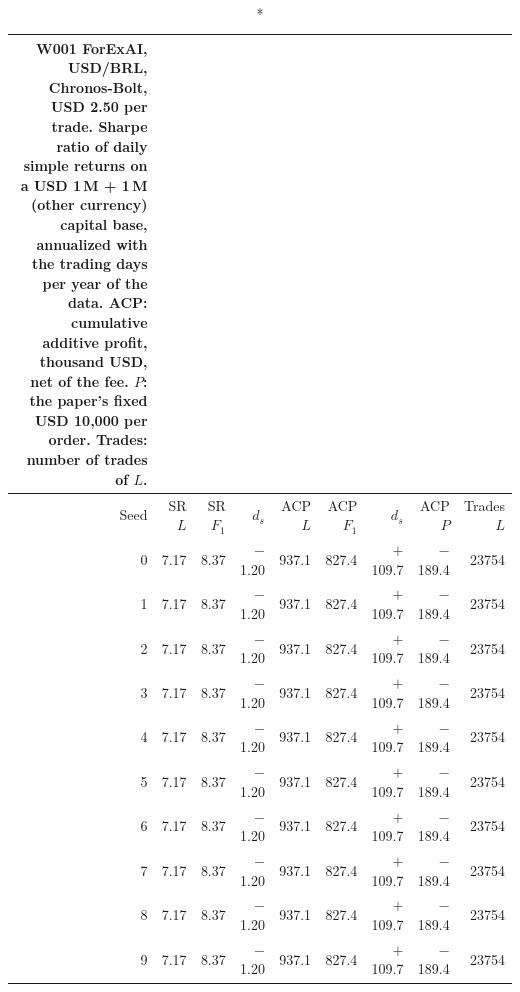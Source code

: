 \begin{longtable}{@{}rrrrrrrrr@{}}
\caption*{\small W001 ForExAI, USD/BRL, Chronos-Bolt, USD 2.50 per trade. Sharpe ratio of daily simple returns on a USD 1\,M + 1\,M (other currency) capital base, annualized with the trading days per year of the data. ACP: cumulative additive profit, thousand USD, net of the fee. $P$: the paper's fixed USD 10,000 per order. Trades: number of trades of $L$.}\\
\toprule
Seed & SR $L$ & SR $F_1$ & $d_s$ & ACP $L$ & ACP $F_1$ & $d_s$ & ACP $P$ & Trades $L$\\ \midrule\endhead
0 & 7.17 & 8.37 & $-$1.20 & 937.1 & 827.4 & $+$109.7 & $-$189.4 & 23754\\
1 & 7.17 & 8.37 & $-$1.20 & 937.1 & 827.4 & $+$109.7 & $-$189.4 & 23754\\
2 & 7.17 & 8.37 & $-$1.20 & 937.1 & 827.4 & $+$109.7 & $-$189.4 & 23754\\
3 & 7.17 & 8.37 & $-$1.20 & 937.1 & 827.4 & $+$109.7 & $-$189.4 & 23754\\
4 & 7.17 & 8.37 & $-$1.20 & 937.1 & 827.4 & $+$109.7 & $-$189.4 & 23754\\
5 & 7.17 & 8.37 & $-$1.20 & 937.1 & 827.4 & $+$109.7 & $-$189.4 & 23754\\
6 & 7.17 & 8.37 & $-$1.20 & 937.1 & 827.4 & $+$109.7 & $-$189.4 & 23754\\
7 & 7.17 & 8.37 & $-$1.20 & 937.1 & 827.4 & $+$109.7 & $-$189.4 & 23754\\
8 & 7.17 & 8.37 & $-$1.20 & 937.1 & 827.4 & $+$109.7 & $-$189.4 & 23754\\
9 & 7.17 & 8.37 & $-$1.20 & 937.1 & 827.4 & $+$109.7 & $-$189.4 & 23754\\
\bottomrule\end{longtable}
